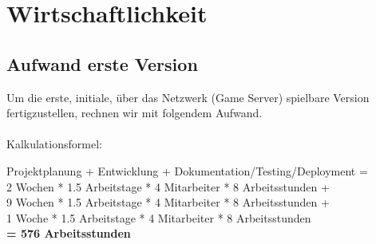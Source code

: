 \documentclass[11pt,ngerman]{article}
\begin{document}
    \section{Wirtschaftlichkeit}

    \subsection{Aufwand erste Version}
    Um die erste, initiale, über das Netzwerk (\Gls{Game Server}) spielbare Version fertigzustellen, rechnen wir mit folgendem Aufwand. \\
    \\
    Kalkulationsformel:
        \begin{center}
            \begin{itshape}
                Projektplanung + Entwicklung + Dokumentation/Testing/Deployment = \\
                \vspace{0.5em}
                2 Wochen * 1.5 Arbeitstage * 4 Mitarbeiter * 8 Arbeitsstunden + \\
                \vspace{0.5em}
                9 Wochen * 1.5 Arbeitstage * 4 Mitarbeiter * 8 Arbeitsstunden + \\
                \vspace{0.5em}
                1 Woche * 1.5 Arbeitstage * 4 Mitarbeiter * 8 Arbeitsstunden \\
                \vspace{0.5em}
                \textbf{= 576 Arbeitsstunden}
            \end{itshape}
        \end{center}
\end{document}

